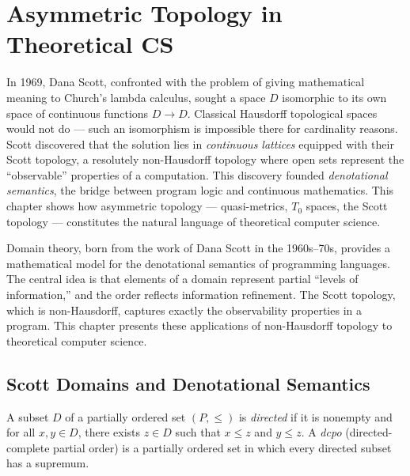 \chapter{Asymmetric Topology in Theoretical CS}
\label{ch:theoretical_cs}

In 1969, Dana Scott, confronted with the problem of giving mathematical meaning to Church's lambda calculus, sought a space $D$ isomorphic to its own space of continuous functions $D \to D$. Classical Hausdorff topological spaces would not do --- such an isomorphism is impossible there for cardinality reasons. Scott discovered that the solution lies in \emph{continuous lattices} equipped with their Scott topology, a resolutely non-Hausdorff topology where open sets represent the ``observable'' properties of a computation. This discovery founded \emph{denotational semantics}, the bridge between program logic and continuous mathematics. This chapter shows how asymmetric topology --- quasi-metrics, $T_0$ spaces, the Scott topology --- constitutes the natural language of theoretical computer science.

\begin{intuition}
Domain theory, born from the work of Dana Scott in the 1960s--70s, provides a mathematical
model for the denotational semantics of programming languages. The central idea is that
elements of a domain represent partial ``levels of information,'' and the order reflects
information refinement. The Scott topology, which is non-Hausdorff, captures exactly the
observability properties in a program. This chapter presents these applications of
non-Hausdorff topology to theoretical computer science.
\end{intuition}

\section{Scott Domains and Denotational Semantics}

\begin{definition}
A subset $D$ of a partially ordered set $(P, \leq)$ is \emph{directed} if it is nonempty
and for all $x, y \in D$, there exists $z \in D$ such that $x \leq z$ and $y \leq z$.
A \emph{dcpo} (directed-complete partial order) is a partially ordered set in which every
directed subset has a supremum.
\end{definition}

